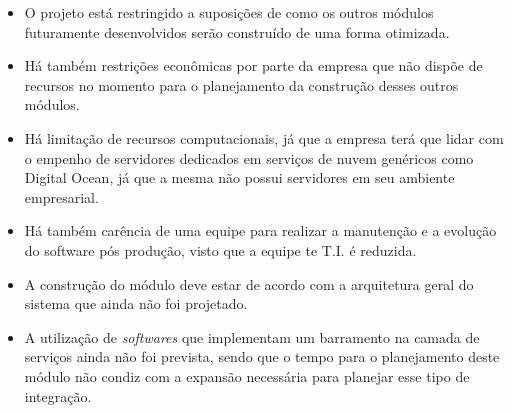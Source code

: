     \begin{itemize}
      \item O projeto está restringido a suposições de como os outros módulos futuramente desenvolvidos serão construído de uma forma otimizada.
      \item Há também restrições econômicas por parte da empresa que não dispõe de recursos no momento para o planejamento da construção desses outros módulos.
      \item Há limitação de recursos computacionais, já que a empresa terá que lidar com o empenho de servidores dedicados em serviços de nuvem genéricos como Digital Ocean, já que a mesma não possui servidores em seu ambiente empresarial.
      \item Há também carência de uma equipe para realizar a manutenção e a evolução do software pós produção, visto que a equipe te T.I. é reduzida.
      \item A construção do módulo deve estar de acordo com a arquitetura geral do sistema que ainda não foi projetado.
      \item A utilização de \textit{softwares} que implementam um barramento na camada de serviços ainda não foi prevista, sendo que o tempo para o planejamento deste módulo não condiz com a expansão necessária para planejar esse tipo de integração.
    \end{itemize} 
